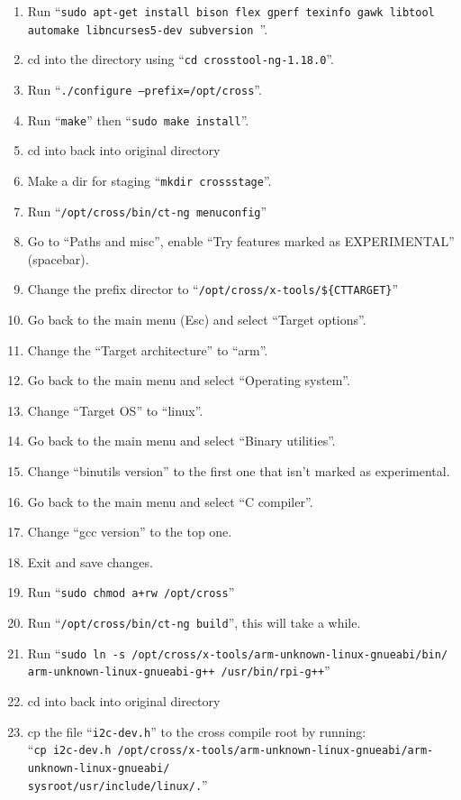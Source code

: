 \documentclass{article}
\begin{document}
\begin{enumerate}
    \item Run ``{\tt sudo apt-get install bison flex gperf texinfo gawk libtool automake libncurses5-dev subversion
    }''.
    \item cd into the directory using ``{\tt cd crosstool-ng-1.18.0}''.
    \item Run ``{\tt ./configure --prefix=/opt/cross}''.
    \item Run ``{\tt make}'' then ``{\tt sudo make install}''.
    \item cd into back into original directory
    \item Make a dir for staging ``{\tt mkdir cross\textunderscore stage}''.
    \item Run ``{\tt /opt/cross/bin/ct-ng menuconfig}''
    \item Go to ``Paths and misc'', enable ``Try features marked as EXPERIMENTAL'' (spacebar).
    \item Change the prefix director to ``{\tt /opt/cross/x-tools/\$\{CT\textunderscore TARGET\}}''
    \item Go back to the main menu (Esc) and select ``Target options''.
    \item Change the ``Target architecture'' to ``arm''.
    \item Go back to the main menu and select ``Operating system''.
    \item Change ``Target OS'' to ``linux''.
    \item Go back to the main menu and select ``Binary utilities''.
    \item Change ``binutils version'' to the first one that isn't marked as experimental.
    \item Go back to the main menu and select ``C compiler''.
    \item Change ``gcc version'' to the top one.
    \item Exit and save changes.
    \item Run ``{\tt sudo chmod a+rw /opt/cross}''
    \item Run ``{\tt /opt/cross/bin/ct-ng build}'', this will take a while.
    \item Run ``{\tt sudo ln -s /opt/cross/x-tools/arm-unknown-linux-gnueabi/bin/ \\ arm-unknown-linux-gnueabi-g++ /usr/bin/rpi-g++}''
    \item cd into back into original directory
    \item cp the file ``{\tt i2c-dev.h}'' to the cross compile root by running: \\
    ``{\tt cp i2c-dev.h /opt/cross/x-tools/arm-unknown-linux-gnueabi/arm-unknown-linux-gnueabi/ \\ sysroot/usr/include/linux/.}''
\end{enumerate}
\end{document}
